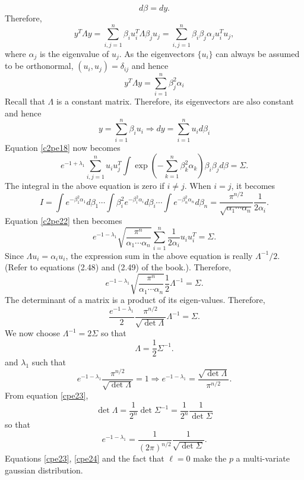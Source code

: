 \begin{enumerate}
\begin{equation}\label{c2pe21}
d\beta = dy.
\end{equation}
Therefore,
\[
y^T\Lambda y = \sum_{i,j=1}^n \beta_i u_i^T \Lambda \beta_j u_j = \sum_{i,j=1}^n \beta_i\beta_j\alpha_j u_i^T u_j,
\]
where $\alpha_j$ is the eigenvalue of $u_j$. As the eigenvectors $\{u_i\}$ can always be 
assumed to be orthonormal, $(u_i, u_j) = \delta_{ij}$ and hence
\[
y^T\Lambda y = \sum_{i=1}^n \beta_j^2\alpha_i
\]
Recall that $\Lambda$ is a constant matrix. Therefore, its eigenvectors are also constant and hence
\[
y = \sum_{i=1}^n\beta_i u_i \Rightarrow dy = \sum_{i=1}^n u_i d\beta_i
\]
Equation \eqref{c2pe18} now becomes
\begin{equation}\label{c2pe22}
e^{-1+\lambda_1}\sum_{i,j=1}^nu_iu_j^T\int \exp\left(-\sum_{k=1}^n\beta_k^2\alpha_k\right)\beta_i\beta_j d\beta = \Sigma.
\end{equation}
The integral in the above equation is zero if $i \ne j$. When $i = j$, it becomes
\[
I = \int e^{-\beta_1^2\alpha_1}d\beta_1 \cdots \int \beta_i^2e^{-\beta_i^2\alpha_i}d\beta_i \cdots \int e^{-\beta_n^2\alpha_n}d\beta_n = \frac{\pi^{n/2}}{\sqrt{\alpha_1 \cdots \alpha_n}}\frac{1}{2\alpha_i}.
\]
Equation \eqref{c2pe22} then becomes
\[
e^{-1-\lambda_1}\sqrt{\frac{\pi^n}{\alpha_1\cdots\alpha_n}}\sum_{i=1}^n \frac{1}{2\alpha_i}u_iu_i^T = \Sigma.
\]
Since $\Lambda u_i = \alpha_i u_i$, the expression sum in the above equation is really $\Lambda^{-1}/2$.
(Refer to equations (2.48) and (2.49) of the book.). Therefore,
\[
e^{-1 - \lambda_1}\sqrt{\frac{\pi^n}{\alpha_1\cdots\alpha_n}}\frac{1}{2}\Lambda^{-1} = \Sigma.
\]
The determinant of a matrix is a product of its eigen-values. Therefore,
\[
\frac{e^{-1 - \lambda_1}}{2}\frac{\pi^{n/2}}{\sqrt{\det\Lambda}}\Lambda^{-1} = \Sigma.
\]
We now choose $\Lambda^{-1} = 2\Sigma$ so that
\begin{equation}\label{cpe23}
\Lambda = \frac{1}{2}\Sigma^{-1}.
\end{equation}
and $\lambda_1$ such that 
\[
e^{-1 - \lambda_1}\frac{\pi^{n/2}}{\sqrt{\det\Lambda}} = 1 \Rightarrow e^{-1-\lambda_1} = \frac{\sqrt{\det\Lambda}}{\pi^{n/2}}.
\]
From equation \eqref{cpe23}, 
\[
\det\Lambda = \frac{1}{2^n}\det\Sigma^{-1} = \frac{1}{2^n}\frac{1}{\det\Sigma}
\]
so that
\begin{equation}\label{cpe24}
e^{-1 - \lambda_1} = \frac{1}{(2\pi)^{n/2}}\frac{1}{\sqrt{\det\Sigma}}.
\end{equation}
Equations \eqref{cpe23}, \eqref{cpe24} and the fact that $\ell = 0$ make the $p$ a multi-variate
gaussian distribution.


\end{enumerate}
